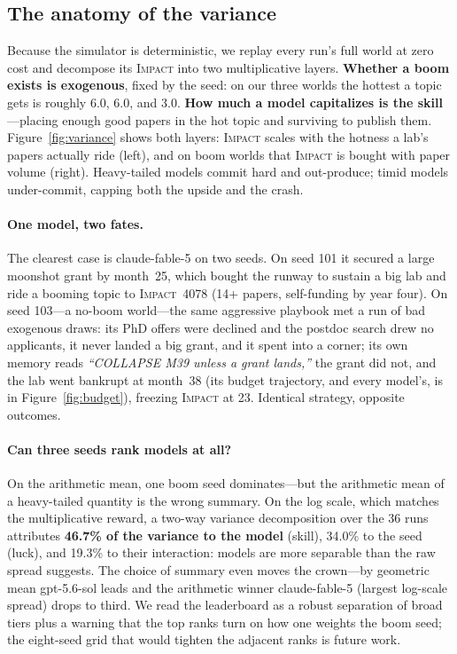 \documentclass[11pt]{article}
\newcommand{\impact}{\textsc{Impact}}
\begin{document}
\subsection{The anatomy of the variance}
Because the simulator is deterministic, we replay every run's full world at zero cost and
decompose its \impact{} into two multiplicative layers. \textbf{Whether a boom exists is
exogenous}, fixed by the seed: on our three worlds the hottest a topic gets is roughly 6.0, 6.0,
and 3.0. \textbf{How much a model capitalizes is the skill}---placing enough good papers in the
hot topic and surviving to publish them. Figure~\ref{fig:variance} shows both layers: \impact{}
scales with the hotness a lab's papers actually ride (left), and on boom worlds that \impact{} is
bought with paper volume (right). Heavy-tailed models commit hard and out-produce; timid models
under-commit, capping both the upside and the crash.

\paragraph{One model, two fates.} The clearest case is claude-fable-5 on two seeds. On seed 101 it
secured a large moonshot grant by month~25, which bought the runway to sustain a big lab and ride a
booming topic to \impact{}~4078 (14+ papers, self-funding by year four). On seed 103---a no-boom
world---the same aggressive playbook met a run of bad exogenous draws: its PhD offers were
declined and the postdoc search drew no applicants, it never landed a big grant, and it spent into
a corner; its own memory reads \emph{``COLLAPSE M39 unless a grant lands,''} the grant did not, and
the lab went bankrupt at month~38 (its budget trajectory, and every model's, is in
Figure~\ref{fig:budget}), freezing \impact{} at 23. Identical strategy, opposite outcomes.

\paragraph{Can three seeds rank models at all?} On the arithmetic mean, one boom seed
dominates---but the arithmetic mean of a heavy-tailed quantity is the wrong summary. On the log
scale, which matches the multiplicative reward, a two-way variance decomposition over the 36 runs
attributes \textbf{46.7\% of the variance to the model} (skill), 34.0\% to the seed (luck), and
19.3\% to their interaction: models are more separable than the raw spread suggests. The choice of
summary even moves the crown---by geometric mean gpt-5.6-sol leads and the arithmetic winner
claude-fable-5 (largest log-scale spread) drops to third. We read the leaderboard as a robust
separation of broad tiers plus a warning that the top ranks turn on how one weights the boom seed;
the eight-seed grid that would tighten the adjacent ranks is future work.
\end{document}
